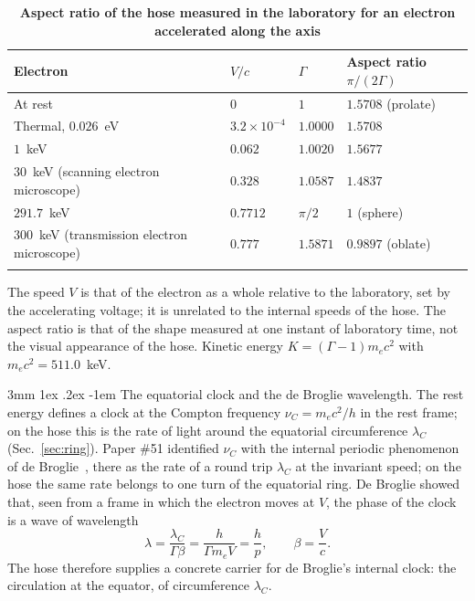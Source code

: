 \documentclass[%
 reprint, amsmath,amssymb, aps, prb, ]{revtex4-2}
\makeatletter
\numberwithin{equation}{section}
\renewcommand\paragraph{%
  \@startsection{paragraph}{4}{\z@}%
    {3mm \@plus 1ex \@minus .2ex}%
    {-1em}%
    {\normalfont\normalsize\itshape}}
\newcommand{\lamC}{\lambda_C}
\makeatother
\begin{document}
\begin{table}[t!]
\centering
\caption{\textbf{Aspect ratio of the hose measured in the laboratory for an electron accelerated along the axis}}
\label{tab:boost}
\renewcommand{\arraystretch}{1.4}
\begin{tabular}{p{6.6cm}p{2.6cm}p{2.6cm}p{3.7cm}}
\toprule
\textbf{Electron} & \textbf{$V/c$} & \textbf{$\Gamma$} & \textbf{Aspect ratio $\pi/(2\Gamma)$} \\
\midrule
At rest & $0$ & $1$ & $1.5708$ (prolate) \\
\addlinespace[0.3cm]
Thermal, $0.026$~eV & $3.2\times10^{-4}$ & $1.0000$ & $1.5708$ \\
\addlinespace[0.3cm]
$1$~keV & $0.062$ & $1.0020$ & $1.5677$ \\
\addlinespace[0.3cm]
$30$~keV (scanning electron microscope) & $0.328$ & $1.0587$ & $1.4837$ \\
\addlinespace[0.3cm]
$291.7$~keV & $0.7712$ & $\pi/2$ & $1$ (sphere) \\
\addlinespace[0.3cm]
$300$~keV (transmission electron microscope) & $0.777$ & $1.5871$ & $0.9897$ (oblate) \\
\addlinespace[0.2cm]
\bottomrule
\end{tabular}
\vspace{0.2cm}
\begin{minipage}{0.95\textwidth}
\justifying\footnotesize
The speed $V$ is that of the electron as a whole relative to the laboratory, set by the accelerating voltage; it is unrelated to the internal speeds of the hose. The aspect ratio is that of the shape measured at one instant of laboratory time, not the visual appearance of the hose. Kinetic energy $K = (\Gamma - 1)m_ec^2$ with $m_ec^2 = 511.0$~keV.
\end{minipage}
\end{table}

\paragraph{The equatorial clock and the de Broglie wavelength.} The rest energy defines a clock at the Compton frequency $\nu_C = m_ec^2/h$ in the rest frame; on the hose this is the rate of light around the equatorial circumference $\lamC$ (Sec.~\ref{sec:ring}). Paper \#51 identified $\nu_C$ with the internal periodic phenomenon of de Broglie~\cite{H51}, there as the rate of a round trip $\lamC$ at the invariant speed; on the hose the same rate belongs to one turn of the equatorial ring. De Broglie showed that, seen from a frame in which the electron moves at $V$, the phase of the clock is a wave of wavelength~\cite{deBroglie1925}
\begin{equation}
\lambda = \frac{\lamC}{\Gamma\beta} = \frac{h}{\Gamma m_e V} = \frac{h}{p}, \qquad \beta = \frac{V}{c} .
\label{eq:dB}
\end{equation}
The hose therefore supplies a concrete carrier for de Broglie's internal clock: the circulation at the equator, of circumference $\lamC$.
\end{document}
